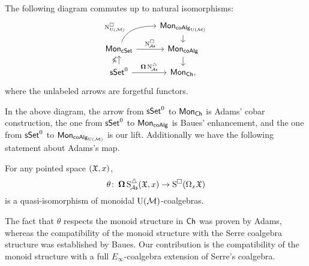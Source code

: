 \begin{theorem*}
	The following diagram commutes up to natural isomorphisms:
	\[
	\begin{tikzcd} [row sep=small]
		& \Mon_{\coAlg_\UM} \arrow[d] \\
		\Mon_{\cSet} \arrow[ru, "\cchainsUM", out=70, in=180, near start] \arrow[r, "\cchainsA"]
		& \Mon_{\coAlg} \arrow[d] \\
		\sSet^0 \arrow[r, "\cobar \schainsA"] \arrow[u, "\ccobar"]
		& \Mon_{\Ch},
	\end{tikzcd}
	\]
	where the unlabeled arrows are forgetful functors.
\end{theorem*}

In the above diagram, the arrow from $\mathsf{sSet}^0$ to $\mathsf{Mon}_{\mathsf{Ch}}$ is Adams' cobar construction, the one from $\mathsf{sSet}^0$ to $\mathsf{Mon}_{\mathsf{coAlg}}$ is Baues' enhancement, and the one from $\mathsf{sSet}^0$ to $\mathsf{Mon}_{\mathsf{coAlg}_{{\operatorname{U}(\mathcal{M})}}}$ is our lift.
Additionally we have the following statement about Adams's map.

\begin{theorem*}
	For any pointed space $(\mathfrak{X}, x)$,
	\[
	\theta \colon \operatorname{\mathbf{\Omega}} \operatorname{S^{\triangle}_{\!{\mathcal{A}\mathsf{s}}}}(\mathfrak{X}, x) \to \operatorname{S^{\square}}(\Omega_x \mathfrak{X})
	\]
	is a quasi-isomorphism of monoidal ${\operatorname{U}(\mathcal{M})}$-coalgebras.
\end{theorem*}

The fact that $\theta$ respects the monoid structure in $\mathsf{Ch}$ was proven by Adams, whereas the compatibility of the monoid structure with the Serre coalgebra structure was established by Baues.
Our contribution is the compatibility of the monoid structure with a full $E_\infty$-coalgebra extension of Serre's coalgebra.